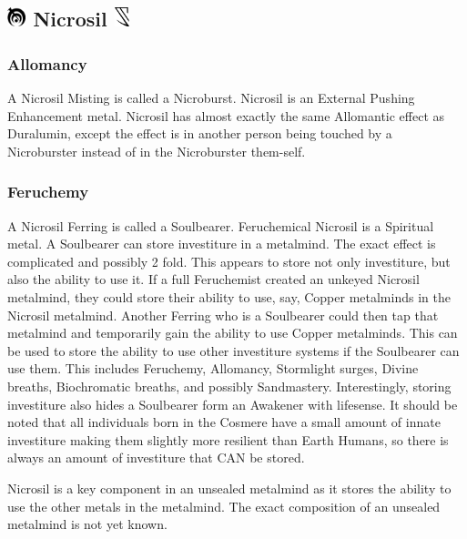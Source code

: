 \documentclass[conference]{IEEEtran}
\begin{document}
\subsection*{\includegraphics[height=1em]{images/Nicrosil.png}  \textbf{Nicrosil} \includegraphics[height=1em]{images/Nicrosil_(Feruchemy).png}}
\subsubsection*{\textbf{Allomancy}}
A Nicrosil Misting is called a Nicroburst.\cite{ARS}  Nicrosil is an External Pushing Enhancement metal.\cite{AL-TB}  Nicrosil has almost exactly the same Allomantic effect as Duralumin, except the effect is in another person being touched by a Nicroburster instead of in the Nicroburster them-self.\cite{ARS}\\
\subsubsection*{\textbf{Feruchemy}}
A Nicrosil Ferring is called a Soulbearer.\cite{ARS}  Feruchemical Nicrosil is a Spiritual metal.\cite{FE-TB}  A Soulbearer can store investiture in a metalmind.\cite{ARS}  The exact effect is complicated and possibly 2 fold.  This appears to store not only investiture, but also the ability to use it.  If a full Feruchemist created an unkeyed Nicrosil metalmind, they could store their ability to use, say, Copper metalminds in the Nicrosil metalmind.  Another Ferring who is a Soulbearer could then tap that metalmind and temporarily gain the ability to use Copper metalminds.  This can be used to store the ability to use other investiture systems if the Soulbearer can use them.  This includes Feruchemy,\cite{BoM-CH21} Allomancy,\cite{BoM-CH28} Stormlight surges,\cite{nic-universal} Divine breaths, \cite{nic-universal}Biochromatic breaths,\cite{PvAvI} and possibly Sandmastery.  
Interestingly, storing investiture also hides a Soulbearer form an Awakener with lifesense.\cite{inv-hid}  It should be noted that all individuals born in the Cosmere have a small amount of innate investiture making them slightly more resilient than Earth Humans,\cite{PvAvI} so there is always an amount of investiture that CAN be stored.

Nicrosil is a key component in an unsealed metalmind as it stores the ability to use the other metals in the metalmind.\cite{BoM-CH21}  The exact composition of an unsealed metalmind is not yet known.\\
\end{document}
